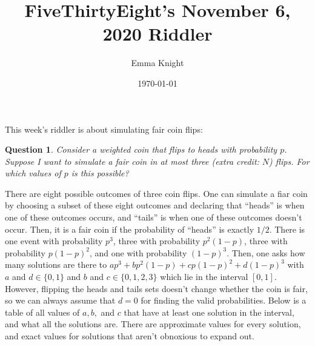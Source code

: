\documentclass[11pt]{article}
\title{FiveThirtyEight's November 6, 2020 Riddler}
\author{Emma Knight}
\date{\today}
\newtheorem{question}[theorem]{Question}
\theoremstyle{definition}
\begin{document}
\maketitle
This week's riddler is about simulating fair coin flips:
\begin{question}
Consider a weighted coin that flips to heads with probability $p$.  Suppose I want to simulate a fair coin in at most three (extra credit: $N$) flips. For which values of $p$ is this possible?
\end{question}
There are eight possible outcomes of three coin flips.  One can simulate a fiar coin by choosing a subset of these eight outcomes and declaring that ``heads'' is when one of these outcomes occurs, and ``tails'' is when one of these outcomes doesn't occur.  Then, it is a fair coin if the probability of ``heads'' is exactly $1/2$.  There is one event with probability $p^3$, three with probability $p^2(1-p)$, three with probability $p(1-p)^2$, and one with probability $(1-p)^3$.  Then, one asks how many solutions are there to $ap^3 + bp^2(1-p) + cp(1-p)^2 + d(1-p)^3$ with $a$ and $d \in \{0, 1\}$ and $b$ and $c \in \{ 0, 1, 2, 3\}$ which lie in the interval $[0, 1]$.  However, flipping the heads and tails sets doesn't change whether the coin is fair, so we can always assume that $d=0$ for finding the valid probabilities.  Below is a table of all values of $a, b,$ and $c$ that have at least one solution in the interval, and what all the solutions are.  There are approximate values for every solution, and exact values for solutions that aren't obnoxious to expand out.
\end{document}
